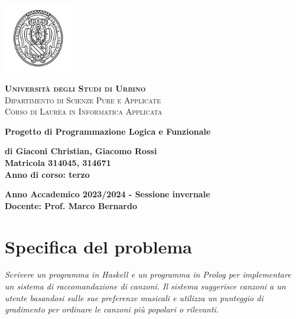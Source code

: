 \documentclass[a4paper,11pt]{article}
\begin{document}
\begin{center}
    \includegraphics[width=3cm]{logo.png}
\end{center}

\begin{center}
    \textsc{\textbf{Università degli Studi di Urbino}}\\
    \textsc{Dipartimento di Scienze Pure e Applicate}\\
    \textsc{Corso di Laurea in Informatica Applicata}
\end{center}

\vspace{2cm}

\begin{center}
    \textbf{\Large Progetto di Programmazione Logica e Funzionale}
\end{center}

\vspace{2cm}

\begin{center}
    \textbf{di Giaconi Christian, Giacomo Rossi} \\ %
    \textbf{Matricola 314045, 314671} \\ %
    \textbf{Anno di corso: terzo}
\end{center}

\vspace{2cm}

\begin{center}
    \textbf{Anno Accademico 2023/2024 - Sessione invernale}\\
    \vspace{1cm}
    \textbf{Docente: Prof. Marco Bernardo}
\end{center}

\newpage
\tableofcontents

\newpage
\section{Specifica del problema}
\textit{Scrivere un programma in Haskell e un programma in Prolog per implementare un sistema di raccomandazione di canzoni. Il sistema suggerisce canzoni a un utente basandosi sulle sue preferenze musicali e utilizza un punteggio di gradimento per ordinare le canzoni più popolari o rilevanti.}
\end{document}
